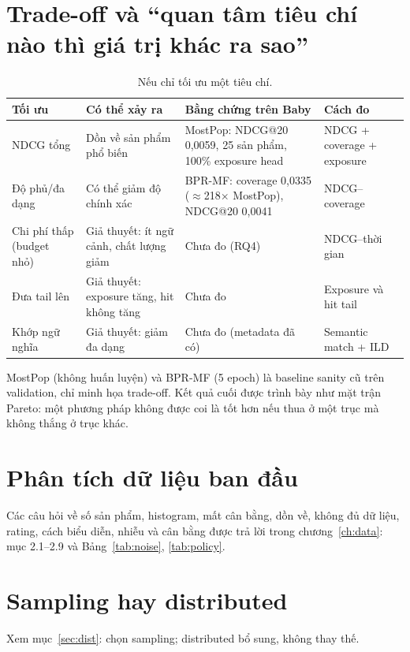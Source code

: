 \documentclass[11pt,a4paper,oneside]{report}
\begin{document}
\section{Trade-off và ``quan tâm tiêu chí nào thì giá trị khác ra sao''}
\begin{table}[h]
\centering\small
\caption{Nếu chỉ tối ưu một tiêu chí.}\label{tab:tradeoff}
\begin{tabularx}{\linewidth}{p{2.3cm}YYp{2.8cm}}
\toprule
Tối ưu & Có thể xảy ra & Bằng chứng trên Baby & Cách đo \\
\midrule
NDCG tổng & Dồn về sản phẩm phổ biến & MostPop: NDCG@20 0,0059, 25 sản phẩm, 100\% exposure head & NDCG + coverage + exposure \\
Độ phủ/đa dạng & Có thể giảm độ chính xác & BPR-MF: coverage 0,0335 ($\approx$218$\times$ MostPop), NDCG@20 0,0041 & NDCG--coverage \\
Chi phí thấp (budget nhỏ) & Giả thuyết: ít ngữ cảnh, chất lượng giảm & Chưa đo (RQ4) & NDCG--thời gian \\
Đưa tail lên & Giả thuyết: exposure tăng, hit không tăng & Chưa đo & Exposure và hit tail \\
Khớp ngữ nghĩa & Giả thuyết: giảm đa dạng & Chưa đo (metadata đã có) & Semantic match + ILD \\
\bottomrule
\end{tabularx}
\end{table}
MostPop (không huấn luyện) và BPR-MF (5 epoch) là baseline sanity cũ trên validation, chỉ minh họa trade-off. Kết quả cuối được trình bày như mặt trận Pareto: một phương pháp không được coi là tốt hơn nếu thua ở một trục mà không thắng ở trục khác.

\section{Phân tích dữ liệu ban đầu}
Các câu hỏi về số sản phẩm, histogram, mất cân bằng, dồn về, không đủ dữ liệu, rating, cách biểu diễn, nhiễu và cân bằng được trả lời trong chương~\ref{ch:data}: mục 2.1--2.9 và Bảng~\ref{tab:noise}, \ref{tab:policy}.

\section{Sampling hay distributed}
Xem mục~\ref{sec:dist}: chọn sampling; distributed bổ sung, không thay thế.
\end{document}
